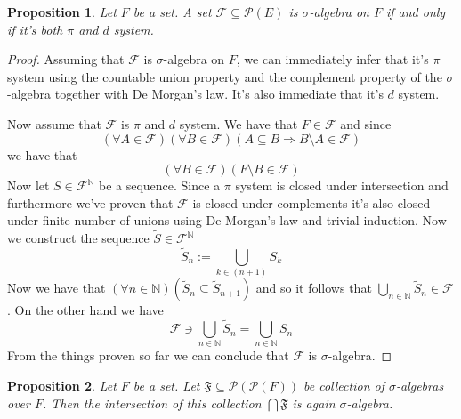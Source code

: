 \documentclass[a4paper]{amsart}
\newtheorem{prop}{Proposition}
\newcommand{\pow}[1]{\mathscr{P}\left(#1\right)}
\newcommand{\NN}{\mathbb{N}}
\begin{document}
\begin{prop}
    Let $F$ be a set. A set $\mathcal{F} \subseteq \pow{E}$ is 
    $\sigma$-algebra on $F$ if and only if it's both $\pi$ and 
    $d$ system.
\end{prop}

\begin{proof}
    Assuming that $\mathcal{F}$ is $\sigma$-algebra on $F$,
    we can immediately infer that it's $\pi$ system using the 
    countable union property and the complement property of 
    the $\sigma$-algebra together with De Morgan's law. It's 
    also immediate that it's $d$ system.
    
    Now assume that $\mathcal{F}$ is $\pi$ and $d$ system. We have that $F \in \mathcal{F}$
    and since
    $$\left(\forall A \in \mathcal{F}\right) \left(\forall B \in \mathcal{F}\right)
    \left( A \subseteq B \Longrightarrow B \setminus A \in\mathcal{F} \right)$$
    we have that
    $$\left(\forall B \in \mathcal{F}\right)  \left( F \setminus B \in \mathcal{F} \right)$$
    Now let $S\in \mathcal{F}^\NN$ be a sequence. 
    Since a $\pi$ system is closed under intersection and 
    furthermore we've proven that 
    $\mathcal{F}$ is closed under complements it's also 
    closed under finite number of unions using De Morgan's 
    law and trivial induction. Now we construct the sequence $\tilde{S}\in \mathcal{F}^\NN$
    $$
    \tilde{S}_n := \bigcup\limits_{k\in (n + 1)} S_k
    $$
    Now we have that 
    $ \left(\forall n \in \NN\right) \left( \tilde{S}_n  \subseteq \tilde{S}_{n+1} \right)$
    and so it follows that
    $\bigcup\limits_{n\in \NN} \tilde{S}_n \in \mathcal{F}$.
    On the other hand we have
    $$
    \mathcal{F} \ni \bigcup\limits_{n\in \NN} \tilde{S}_n = \bigcup\limits_{n\in \NN} S_n 
    $$
    From the things proven so far we can conclude that $\mathcal{F}$ is $\sigma$-algebra.
\end{proof}

\begin{prop}
    Let $F$ be a set. Let $\mathfrak{F} \subseteq \pow{\pow{F}}$ be collection of $\sigma$-algebras over 
    $F$. Then the intersection of this collection $\bigcap \mathfrak{F}$ is again $\sigma$-algebra.
\end{prop}
\end{document}
